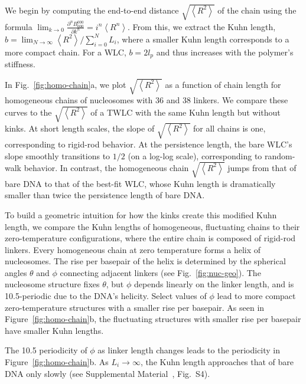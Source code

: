 \documentclass[%
 reprint,
superscriptaddress,
showpacs,preprintnumbers,
 amsmath,amssymb,
 aps,
 prl,
floatfix,
]{revtex4-1}
\newcommand{\RR}{\left\langle{}R^2\right\rangle{}}
\begin{document}
We begin by computing the end-to-end distance $\sqrt{\RR}$ of the
    chain using the formula $\lim_{k\to0} \frac{\partial^{n} B_{000}^{000}}{\partial k^{n}} = i^n \left\langle
    R^n\right\rangle$.
From this, we extract the Kuhn length, $b = \lim_{N\to\infty} \RR/\sum_{i=0}^N L_i$, {\color{red}where a smaller Kuhn length corresponds to a more compact chain. For a WLC, $b=2l_p$ and thus increases with the polymer's stiffness.}

In Fig.~\ref{fig:homo-chain}a, we plot $\sqrt{\RR}$ as a function of chain
    length for homogeneous chains of nucleosomes with \SI{36}{\basepair} and \SI{38}{\basepair}
    linkers. We compare these curves to the $\sqrt{\RR}$ of a TWLC with the same Kuhn length but without kinks.
At short length scales, the slope of $\sqrt{\RR}$ for all chains is one,
    corresponding to rigid-rod behavior.
At the persistence length, the bare WLC's slope smoothly transitions to $1/2$ (on a log-log scale), corresponding to random-walk behavior. In contrast, the homogeneous chain $\sqrt{\RR}$ jumps from that of bare DNA to that of the best-fit WLC, whose Kuhn length is dramatically smaller than twice the persistence length of bare DNA\@.

To build a geometric intuition for how the kinks create this modified Kuhn
    length, we compare the Kuhn lengths of homogeneous, fluctuating chains to their
    zero-temperature configurations, where the entire chain is composed of
    rigid-rod linkers.
Every homogeneous chain at zero temperature forms a helix of nucleosomes.
The rise per basepair of the helix is determined by the spherical angles
    $\theta$ and $\phi$ connecting adjacent linkers (see Fig.~\ref{fig:nuc-geo}).
The nucleosome structure fixes $\theta$, but $\phi$ depends linearly on the
    linker length, and is \SI{10.5}{\basepair}-periodic due to the DNA's helicity.
Select values of $\phi$ lead to more compact zero-temperature structures with a
    smaller rise per basepair.
As seen in Figure~\ref{fig:homo-chain}b, the fluctuating structures with
smaller rise per basepair have smaller Kuhn lengths.

The \SI{10.5}{\basepair} periodicity of $\phi$ as linker length changes leads
    to the periodicity in Figure~\ref{fig:homo-chain}b.
As $L_i\to\infty$, the Kuhn length approaches that of bare DNA only slowly (see Supplemental Material~\cite{supplemental}, Fig.~S4).
\end{document}
